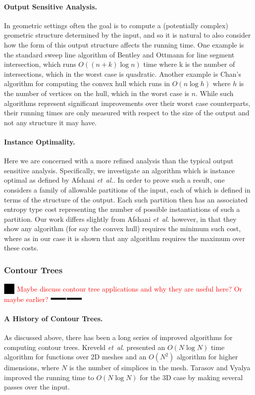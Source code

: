 \documentclass[11pt]{article}
\theoremstyle{definition}
\newcommand{\etal}{\textit{et~al.}\xspace}
\newcommand{\XSays}[2]{{
      {$\rule[-0.12cm]{0.2in}{0.5cm}$\fbox{\tt
            #1:} }
      \textcolor{red}{#2}
      \marginpar{\textcolor{blue}{#1}}
      {$\rule[0.1cm]{0.3in}{0.1cm}$\fbox{\tt
            end}$\rule[0.1cm]{0.3in}{0.1cm}$}
      }
   }
\newcommand{\Ben}[1]{{\XSays{Ben}{#1}}}
\begin{document}
\paragraph{Output Sensitive Analysis.}
In geometric settings often the goal is to compute a (potentially complex) geometric structure determined 
by the input, and so it is natural to also consider how the form of this output structure affects the running time.
One example is the standard sweep line algorithm of Bentley and Ottmann \cite{bo-arcgi-79} for line segment intersection, 
which runs $O((n+k)\log n)$ time where k is the number of intersections, which in the worst case is quadratic.
Another example is Chan's algorithm for computing the convex hull \cite{c-ooscha-96} which runs in $O(n\log h)$ 
where $h$ is the number of vertices on the hull, which in the worst case is $n$.  While such algorithms represent 
significant improvements over their worst case counterparts, their running times are only measured with respect 
to the size of the output and not any structure it may have.

\paragraph{Instance Optimality.}  
Here we are concerned with a more refined analysis than the typical output sensitive analysis.
Specifically, we investigate an algorithm which is instance optimal as defined by Afshani \etal \cite{abc-ioga-09}.  
In order to prove such a result, one considers a family of allowable partitions of the input, 
each of which is defined in terms of the structure of the output.  Each such partition then has 
an associated entropy type cost representing the number of possible instantiations of such a partition.
Our work differs slightly from Afshani \etal \cite{abc-ioga-09} however, in that they show any algorithm 
(for say the convex hull) requires the minimum such cost, where as in our case it is shown that 
any algorithm requires the maximum over these costs.


\subsubsection{Contour Trees}

\Ben{Maybe discuss contour tree applications and why they are useful here? Or maybe earlier?}

\paragraph{A History of Contour Trees.}
As discussed above, there has been a long series of improved algorithms for computing contour trees.
Kreveld \etal \cite{kobps-ctsssit-97} presented an $O(N\log N)$ time algorithm for functions over 2D 
meshes and an $O(N^2)$ algorithm for higher dimensions, where $N$ is the number of simplices in the mesh. 
Tarasov and Vyalya \cite{tv-cct-98} improved the running time to $O(N\log N)$ for the 3D case by making 
several passes over the input.
\end{document}
